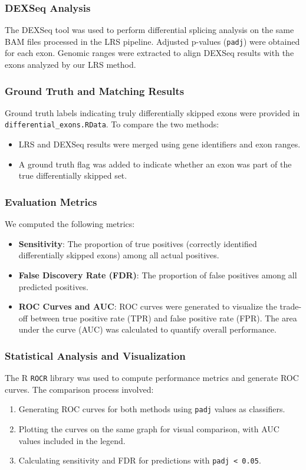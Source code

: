 \documentclass{article}
\begin{document}
    \subsubsection{DEXSeq Analysis}
    The DEXSeq\cite{love_huber_anders_2014} tool was used to perform differential splicing analysis on the same BAM files processed in the LRS pipeline. Adjusted p-values (\texttt{padj}) were obtained for each exon. Genomic ranges were extracted to align DEXSeq results with the exons analyzed by our LRS method.

    \subsubsection{Ground Truth and Matching Results}
    Ground truth labels indicating truly differentially skipped exons were provided in \texttt{differential\_exons.RData}. To compare the two methods:
    \begin{itemize}
        \item LRS and DEXSeq results were merged using gene identifiers and exon ranges.
        \item A ground truth flag was added to indicate whether an exon was part of the true differentially skipped set.
    \end{itemize}

    \subsubsection{Evaluation Metrics}
    We computed the following metrics:
    \begin{itemize}
        \item \textbf{Sensitivity}: The proportion of true positives (correctly identified differentially skipped exons) among all actual positives.
        \item \textbf{False Discovery Rate (FDR)}: The proportion of false positives among all predicted positives.
        \item \textbf{ROC Curves and AUC}: ROC curves were generated to visualize the trade-off between true positive rate (TPR) and false positive rate (FPR). The area under the curve (AUC) was calculated to quantify overall performance.
    \end{itemize}

    \subsubsection{Statistical Analysis and Visualization}
    The R \texttt{ROCR}\cite{10.1093/bioinformatics/bti623} library was used to compute performance metrics and generate ROC curves. The comparison process involved:
    \begin{enumerate}
        \item Generating ROC curves for both methods using \texttt{padj} values as classifiers.
        \item Plotting the curves on the same graph for visual comparison, with AUC values included in the legend.
        \item Calculating sensitivity and FDR for predictions with \texttt{padj < 0.05}.
    \end{enumerate}
\end{document}
